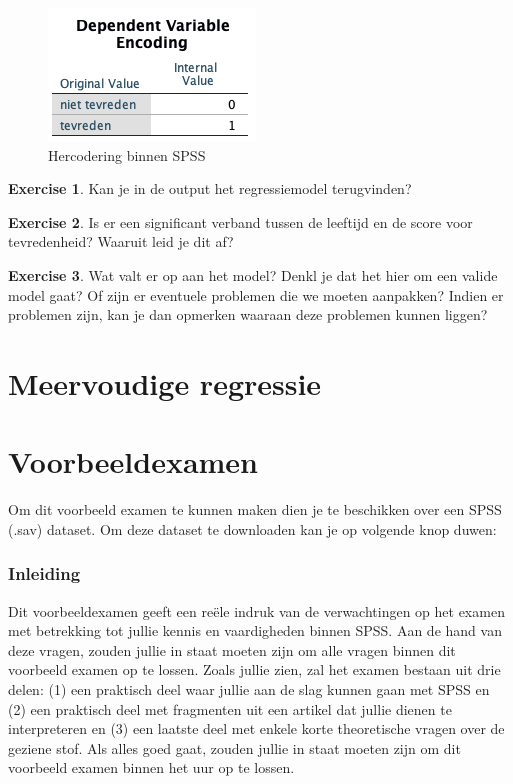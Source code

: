 \documentclass[
]{book}
\theoremstyle{definition}
\theoremstyle{definition}
\theoremstyle{definition}
\newtheorem{exercise}{Exercise}[chapter]
\theoremstyle{definition}
\theoremstyle{remark}
\begin{document}
\begin{figure}
\includegraphics[width=0.4\linewidth]{img/ex_spss_log_4} \caption{Hercodering binnen SPSS}\label{fig:exspsslog4}
\end{figure}

\begin{exercise}
Kan je in de output het regressiemodel terugvinden?
\end{exercise}

\begin{exercise}
Is er een significant verband tussen de leeftijd en de score voor tevredenheid? Waaruit leid je dit af?
\end{exercise}

\begin{exercise}
Wat valt er op aan het model? Denkl je dat het hier om een valide model gaat? Of zijn er eventuele problemen die we moeten aanpakken? Indien er problemen zijn, kan je dan opmerken waaraan deze problemen kunnen liggen?
\end{exercise}

\mainmatter

\hypertarget{multiregr}{%
\chapter{Meervoudige regressie}\label{multiregr}}

\mainmatter

\hypertarget{exam}{%
\chapter{Voorbeeldexamen}\label{exam}}

Om dit voorbeeld examen te kunnen maken dien je te beschikken over een SPSS (.sav) dataset. Om deze dataset te downloaden kan je op volgende knop duwen:

\hypertarget{inleiding-2}{%
\subsection*{Inleiding}\label{inleiding-2}}


Dit voorbeeldexamen geeft een reële indruk van de verwachtingen op het examen met betrekking tot jullie kennis en vaardigheden binnen SPSS. Aan de hand van deze vragen, zouden jullie in staat moeten zijn om alle vragen binnen dit voorbeeld examen op te lossen. Zoals jullie zien, zal het examen bestaan uit drie delen: (1) een praktisch deel waar jullie aan de slag kunnen gaan met SPSS en (2) een praktisch deel met fragmenten uit een artikel dat jullie dienen te interpreteren en (3) een laatste deel met enkele korte theoretische vragen over de geziene stof. Als alles goed gaat, zouden jullie in staat moeten zijn om dit voorbeeld examen binnen het uur op te lossen.
\end{document}
